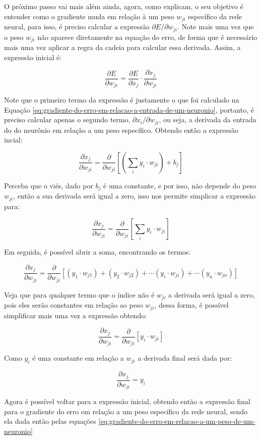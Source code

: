 O próximo passo vai mais além ainda, agora, como \textcite{BackpropagationArticle} explicam, o seu objetivo é entender como o gradiente muda em relação à um peso $w_{ji}$ específico da rede neural, para isso, é preciso calcular a expressão $\partial E / \partial w_{ji}$. Note mais uma vez que o peso $w_{ji}$ não aparece diretamente na equação do erro, de forma que é necessário mais uma vez aplicar a regra da cadeia para calcular essa derivada. Assim, a expressão inicial é:

\[
    \frac{\partial E}{\partial w_{ji}} = \frac{\partial E}{\partial x_j} \cdot \frac{\partial x_j}{\partial w_{ji}}
\]

Note que o primeiro termo da expressão é justamente o que foi calculado na Equação \ref{eq:gradiente-do-erro-em-relacao-a-entrada-de-um-neuronio}, portanto, é preciso calcular apenas o segundo termo, $\partial x_i / \partial w_{ji}$, ou seja, a derivada da entrada do do neurônio em relação a um peso específico. Obtendo então a expressão incial:

\[
    \frac{\partial x_j}{\partial w_{ji}} = \frac{\partial}{\partial w_{ji}} \left[ \left( \sum_i y_i \cdot w_{ji} \right) + b_j\right]
\]

Perceba que o viés, dado por $b_j$ é uma constante, e por isso, não depende do peso $w_{ji}$, então a sua derivada será igual a zero, isso nos permite simplicar a expressão para:

\[
    \frac{\partial x_j}{\partial w_{ji}} = \frac{\partial}{\partial w_{ji}} \left[\sum_i y_i \cdot w_{ji}\right]
\]

Em seguida, é possível abrir a soma, encontrando os termos:

\[
    \frac{\partial x_j}{\partial w_{ji}} = \frac{\partial}{\partial w_{ji}} \left[ (y_1 \cdot w_{j1}) + (y_2 \cdot w_{j2}) + \cdots (y_i \cdot w_{ji}) + \cdots (y_n \cdot w_{jn})\right]
\]

Veja que para qualquer termo que o índice não é $w_{ji}$ a derivada será igual a zero, pois eles serão constantes em relação ao peso $w_{ji}$, dessa forma, é possível simplificar mais uma vez a expressão obtendo:


\[
    \frac{\partial x_j}{\partial w_{ji}} = \frac{\partial}{\partial w_{ji}} \left[  y_i \cdot w_{ji} \right]
\]

Como $y_i$ é uma constante em relação a $w_{ji}$ a derivada final será dada por:

\[
    \frac{\partial x_j}{\partial w_{ji}} = y_i
\]

Agora é possível voltar para a expressão inicial, obtendo então a expressão final para o gradiente do erro em relação a um peso específico da rede neural, sendo ela dada então pelas equações \ref{eq:gradiente-do-erro-em-relacao-a-um-peso-de-um-neuronio}

